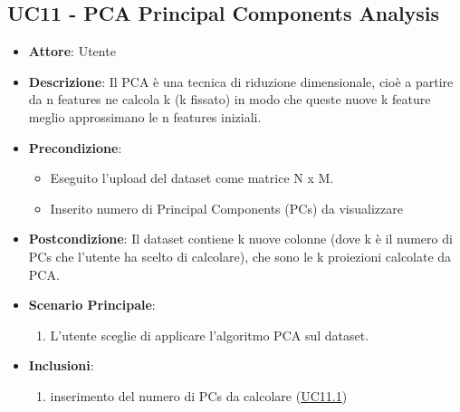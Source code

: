    \subsection{UC11 - PCA Principal Components Analysis}
    \begin{itemize}
    \item \textbf{Attore}: Utente
    \item \textbf{Descrizione}: Il PCA è una tecnica di riduzione dimensionale, cioè a partire da n features ne calcola k (k fissato) in modo che queste nuove k feature meglio approssimano le n features iniziali.
    \item \textbf{Precondizione}: 
    \begin{itemize}
        \item Eseguito l'upload del dataset come matrice N x M.
        \item Inserito numero di Principal Components (PCs) da visualizzare
    \end{itemize}  
    \item \textbf{Postcondizione}: Il dataset contiene k nuove colonne (dove k è il numero di PCs che l'utente ha scelto di calcolare), che sono le k proiezioni calcolate da PCA. 
    \item \textbf{Scenario Principale}: 
    \begin{enumerate}
        \item L'utente sceglie di applicare l'algoritmo PCA sul dataset.
    \end{enumerate}  
    \item \textbf{Inclusioni}:
        \begin{enumerate}
                \begin{enumerate}
                    \item inserimento del numero di PCs da calcolare (\hyperref[uc11.1]{UC11.1})
                \end{enumerate}
        \end{enumerate} 
    \end{itemize}
    
